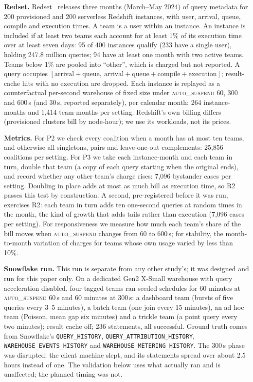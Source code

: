 \documentclass[sigconf]{acmart}
\newcommand{\autos}{\textsc{auto\_suspend}}
\begin{document}
\textbf{Redset.} Redset~\cite{redset} releases three months (March--May 2024) of query metadata for 200 provisioned and 200
serverless Redshift instances, with user, arrival, queue, compile and execution times. A team is a user within an instance.
An instance is included if at least two teams each account for at least 1\% of its execution time over at least seven days:
95 of 400 instances qualify (233 have a single user), holding 247.8 million queries; 94 have at least one month with two
active teams. Teams below 1\% are pooled into ``other'', which is charged but not reported. A query occupies
$[\text{arrival} + \text{queue},\ \text{arrival} + \text{queue} + \text{compile} + \text{execution}]$; result-cache hits with
no execution are dropped. Each instance is replayed as a counterfactual per-second warehouse of fixed size under \autos{} 60,
300 and 600\,s (and 30\,s, reported separately), per calendar month: 264 instance-months and 1,414 team-months per setting.
Redshift's own billing differs (provisioned clusters bill by node-hour); we use its workloads, not its prices.

\textbf{Metrics.} For P2 we check every coalition when a month has at most ten teams, and otherwise all singletons, pairs
and leave-one-out complements: 25,856 coalitions per setting. For P3 we take each instance-month and each team in turn,
double that team (a copy of each query starting when the original ends), and record whether any other team's charge rises:
7,096 bystander cases per setting. Doubling in place adds at most as much bill as execution time, so R2 passes this test by
construction. A second, pre-registered before it was run, exercises R2: each team in turn adds ten one-second queries at
random times in the month, the kind of growth that adds tails rather than execution (7,096 cases per setting). For responsiveness we measure how much each team's share
of the bill moves when \autos{} changes from 60 to 600\,s; for stability, the month-to-month variation of charges for teams
whose own usage varied by less than 10\%.

\textbf{Snowflake run.} This run is separate from any other study's; it was designed and run for this paper only. On a dedicated Gen2 X-Small warehouse with query acceleration disabled, four tagged teams ran seeded
schedules for 60 minutes at \autos{} 60\,s and 60 minutes at 300\,s: a dashboard team (bursts of five queries every 3--5
minutes), a batch team (one join every 15 minutes), an ad hoc team (Poisson, mean gap six minutes) and a trickle team (a
point query every two minutes); result cache off; 236 statements, all successful. Ground truth comes from Snowflake's
\texttt{QUERY\_HISTORY}, \texttt{QUERY\_ATTRIBUTION\_HISTORY}, \texttt{WAREHOUSE\_EVENTS\_HISTORY} and
\texttt{WAREHOUSE\_METERING\_HISTORY}. The 300\,s phase was disrupted: the client machine slept, and its statements spread
over about 2.5 hours instead of one. The validation below uses what actually ran and is unaffected; the planned timing was
not.
\end{document}
